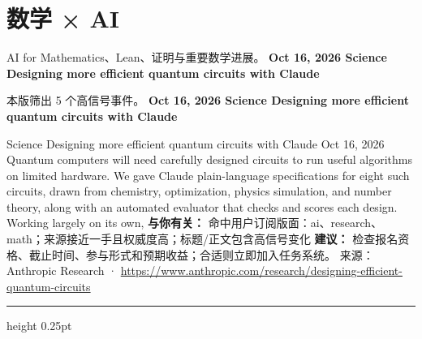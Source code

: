 \documentclass[10.5pt]{ctexart}
\begin{document}
\section*{数学 × AI}
{\color{ormuted} AI for Mathematics、Lean、证明与重要数学进展。}
\vspace{2mm}
{\LARGE\bfseries Oct 16, 2026 Science Designing more efficient quantum circuits with Claude}\par
\vspace{1mm}
{\color{ormuted} 本版筛出 5 个高信号事件。}
\vspace{3mm}
{\Large\bfseries Oct 16, 2026 Science Designing more efficient quantum circuits with Claude}\par
Science Designing more efficient quantum circuits with Claude Oct 16, 2026 Quantum computers will need carefully designed circuits to run useful algorithms on limited hardware. We gave Claude plain-language specifications for eight such circuits, drawn from chemistry, optimization, physics simulation, and number theory, along with an automated evaluator that checks and scores each design. Working largely on its own, 
\textbf{与你有关：} 命中用户订阅版面：ai、research、math；来源接近一手且权威度高；标题/正文包含高信号变化
\textbf{建议：} 检查报名资格、截止时间、参与形式和预期收益；合适则立即加入任务系统。
{\footnotesize\color{ormuted} 来源：Anthropic Research · \url{https://www.anthropic.com/research/designing-efficient-quantum-circuits}}
\vspace{4mm}
\hrule height 0.25pt
\vspace{3mm}
\end{document}
